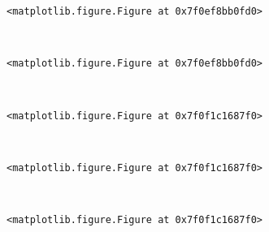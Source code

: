 \documentclass[11pt]{article}
\begin{document}
    
    \begin{verbatim}
<matplotlib.figure.Figure at 0x7f0ef8bb0fd0>
    \end{verbatim}

    
    \begin{center}
    \end{center}
    { \hspace*{\fill} \\}
    
    
    \begin{verbatim}
<matplotlib.figure.Figure at 0x7f0ef8bb0fd0>
    \end{verbatim}

    
    \begin{center}
    \end{center}
    { \hspace*{\fill} \\}
    
    
    \begin{verbatim}
<matplotlib.figure.Figure at 0x7f0f1c1687f0>
    \end{verbatim}

    
    \begin{center}
    \end{center}
    { \hspace*{\fill} \\}
    
    
    \begin{verbatim}
<matplotlib.figure.Figure at 0x7f0f1c1687f0>
    \end{verbatim}

    
    \begin{center}
    \end{center}
    { \hspace*{\fill} \\}
    
    
    \begin{verbatim}
<matplotlib.figure.Figure at 0x7f0f1c1687f0>
    \end{verbatim}

    
    \begin{center}
    \end{center}
    { \hspace*{\fill} \\}
    
\end{document}
